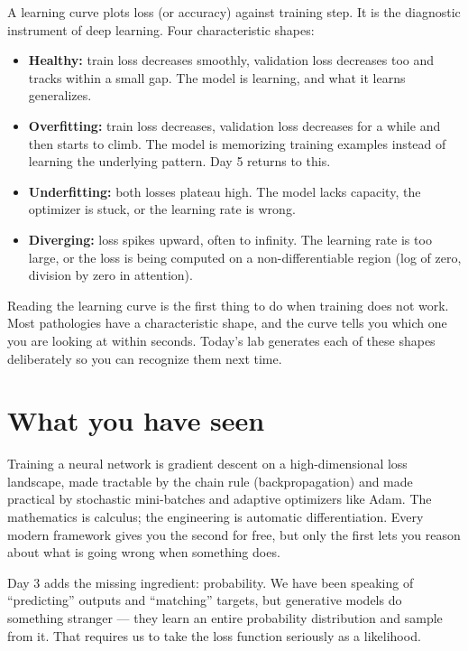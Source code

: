 A learning curve plots loss (or accuracy) against training step. It is the diagnostic instrument of deep learning. Four characteristic shapes:

\begin{itemize}
  \item \textbf{Healthy:} train loss decreases smoothly, validation loss decreases too and tracks within a small gap. The model is learning, and what it learns generalizes.
  \item \textbf{Overfitting:} train loss decreases, validation loss decreases for a while and then starts to climb. The model is memorizing training examples instead of learning the underlying pattern. Day 5 returns to this.
  \item \textbf{Underfitting:} both losses plateau high. The model lacks capacity, the optimizer is stuck, or the learning rate is wrong.
  \item \textbf{Diverging:} loss spikes upward, often to infinity. The learning rate is too large, or the loss is being computed on a non-differentiable region (log of zero, division by zero in attention).
\end{itemize}

\begin{intuition}
Reading the learning curve is the first thing to do when training does not work. Most pathologies have a characteristic shape, and the curve tells you which one you are looking at within seconds. Today's lab generates each of these shapes deliberately so you can recognize them next time.
\end{intuition}

\section{What you have seen}

Training a neural network is gradient descent on a high-dimensional loss landscape, made tractable by the chain rule (backpropagation) and made practical by stochastic mini-batches and adaptive optimizers like Adam. The mathematics is calculus; the engineering is automatic differentiation. Every modern framework gives you the second for free, but only the first lets you reason about what is going wrong when something does.

Day 3 adds the missing ingredient: probability. We have been speaking of ``predicting'' outputs and ``matching'' targets, but generative models do something stranger --- they learn an entire probability distribution and sample from it. That requires us to take the loss function seriously as a likelihood.

